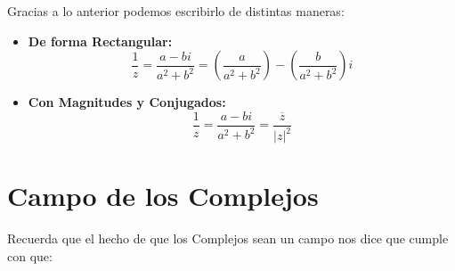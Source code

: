 \documentclass[12pt, fleqn]{report}                             %
\newcommand \Over {\overline}                                   %
\newcommand{\Wrap}[1]{\left( #1 \right)}                        %
\newcommand{\pfrac}[2]{\Wrap{\dfrac{#1}{#2}}}                   %
\begin{document}
            Gracias a lo anterior podemos escribirlo de distintas maneras:

            \begin{itemize}

                \item
                    \textbf{De forma Rectangular:}
                    \begin{equation}
                         \dfrac{1}{z} = \dfrac{a-bi}{a^2+b^2} = \pfrac{a}{a^2+b^2} - \pfrac{b}{a^2+b^2}i 
                    \end{equation}


                \item
                    \textbf{Con Magnitudes y Conjugados:}
                    \begin{equation}
                        \dfrac{1}{z} = \dfrac{a-bi}{a^2+b^2} = \dfrac{\Over{z}}{|z|^2}
                    \end{equation}


            \end{itemize}




        \clearpage
        \section{Campo de los Complejos}

            Recuerda que el hecho de que los Complejos sean un campo nos dice que cumple con que:
\end{document}
